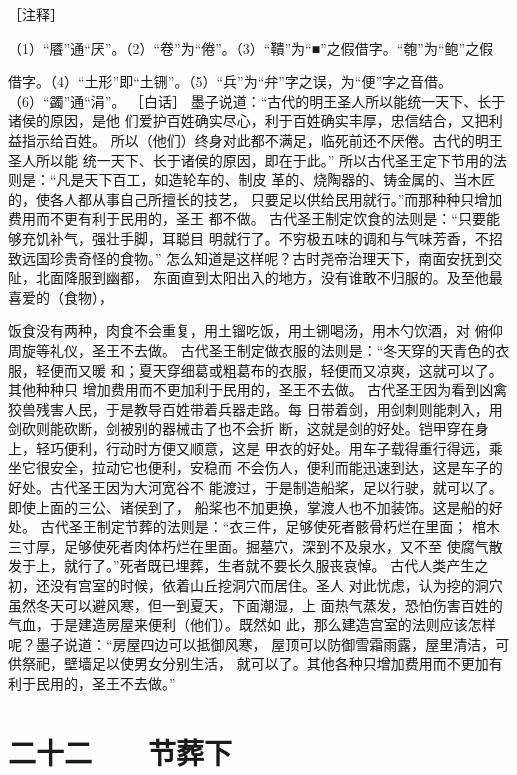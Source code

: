 \documentclass[12pt,UTF8]{ctexbook}
\begin{document}
［注释］ 

（1）“餍”通“厌”。（2）“卷”为“倦”。（3）“鞼”为“■”之假借字。“匏”为“鲍”之假 

借字。（4）“土形”即“土铏”。（5）“兵”为“弁”字之误，为“便”字之音借。（6）“蠲”通“涓”。 
［白话］ 
墨子说道：“古代的明王圣人所以能统一天下、长于诸侯的原因，是他 
们爱护百姓确实尽心，利于百姓确实丰厚，忠信结合，又把利益指示给百姓。 
所以（他们）终身对此都不满足，临死前还不厌倦。古代的明王圣人所以能 
统一天下、长于诸侯的原因，即在于此。” 
所以古代圣王定下节用的法则是：“凡是天下百工，如造轮车的、制皮 
革的、烧陶器的、铸金属的、当木匠的，使各人都从事自己所擅长的技艺， 
只要足以供给民用就行。”而那种种只增加费用而不更有利于民用的，圣王 
都不做。 
古代圣王制定饮食的法则是：“只要能够充饥补气，强壮手脚，耳聪目 
明就行了。不穷极五味的调和与气味芳香，不招致远国珍贵奇怪的食物。” 
怎么知道是这样呢？古时尧帝治理天下，南面安抚到交阯，北面降服到幽都， 
东面直到太阳出入的地方，没有谁敢不归服的。及至他最喜爱的（食物）， 

饭食没有两种，肉食不会重复，用土镏吃饭，用土铏喝汤，用木勺饮酒，对 
俯仰周旋等礼仪，圣王不去做。 
古代圣王制定做衣服的法则是：“冬天穿的天青色的衣服，轻便而又暖 
和；夏天穿细葛或粗葛布的衣服，轻便而又凉爽，这就可以了。其他种种只 
增加费用而不更加利于民用的，圣王不去做。 
古代圣王因为看到凶禽狡兽残害人民，于是教导百姓带着兵器走路。每 
日带着剑，用剑刺则能刺入，用剑砍则能砍断，剑被别的器械击了也不会折 
断，这就是剑的好处。铠甲穿在身上，轻巧便利，行动时方便又顺意，这是 
甲衣的好处。用车子载得重行得远，乘坐它很安全，拉动它也便利，安稳而 
不会伤人，便利而能迅速到达，这是车子的好处。古代圣王因为大河宽谷不 
能渡过，于是制造船桨，足以行驶，就可以了。即使上面的三公、诸侯到了， 
船桨也不加更换，掌渡人也不加装饰。这是船的好处。 
古代圣王制定节葬的法则是：“衣三件，足够使死者骸骨朽烂在里面； 
棺木三寸厚，足够使死者肉体朽烂在里面。掘墓穴，深到不及泉水，又不至 
使腐气散发于上，就行了。”死者既已埋葬，生者就不要长久服丧哀悼。 
古代人类产生之初，还没有宫室的时候，依着山丘挖洞穴而居住。圣人 
对此忧虑，认为挖的洞穴虽然冬天可以避风寒，但一到夏天，下面潮湿，上 
面热气蒸发，恐怕伤害百姓的气血，于是建造房屋来便利（他们）。既然如 
此，那么建造宫室的法则应该怎样呢？墨子说道：“房屋四边可以抵御风寒， 
屋顶可以防御雪霜雨露，屋里清洁，可供祭祀，壁墙足以使男女分别生活， 
就可以了。其他各种只增加费用而不更加有利于民用的，圣王不去做。” 

\chapter{二十二　　节葬下}
\end{document}
